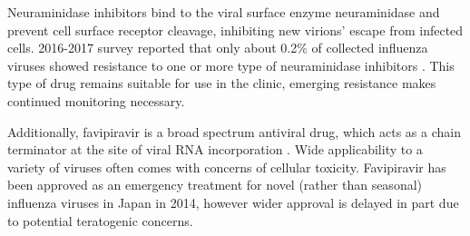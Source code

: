 Neuraminidase inhibitors bind to the viral surface enzyme neuraminidase and prevent cell surface receptor cleavage, inhibiting new virions' escape from infected cells. 2016-2017 survey reported that only about 0.2\% of collected influenza viruses showed resistance to one or more type of neuraminidase inhibitors \cite{lackenby2018global}. This type of drug remains suitable for use in the clinic, emerging resistance makes continued monitoring necessary.

Additionally, favipiravir is a broad spectrum antiviral drug, which acts as a chain terminator at the site of viral RNA incorporation \cite{shiraki2020favipiravir}. Wide applicability to a variety of viruses often comes with concerns of cellular toxicity. Favipiravir has been approved as an emergency treatment for novel (rather than seasonal) influenza viruses in Japan in 2014, however wider approval is delayed in part due to potential teratogenic concerns.
